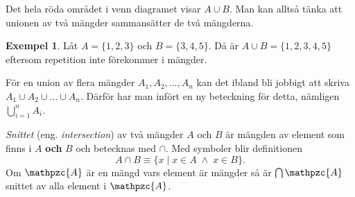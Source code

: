 \documentclass{article}
\theoremstyle{definition}
\newtheorem{exmp}[thm]{Exempel}
\begin{document}
\begin{center}
\end{center}
Det hela röda området i venn diagramet visar $A \cup B$. Man kan alltså tänka att unionen
av två mängder sammansätter de två mängderna.
\begin{exmp}
  Låt $A = \{1, 2, 3\}$ och $B = \{3, 4, 5\}$. Då är $A \cup B = \{1, 2, 3, 4, 5\}$ 
  eftersom repetition inte förekommer i mängder.   
\end{exmp}
För en union av flera mängder $A_1, A_2, \ldots, A_n$
kan det ibland bli jobbigt att skriva $A_1 \cup A_2 \cup \ldots \cup A_n$. Därför har man infört 
en ny beteckning för detta, nämligen $\bigcup\limits_{i=1}^{n} A_i$. 

\begin{mydef}{}{}
  \textit{Snittet} (eng. \textit{intersection}) av två mängder $A$ och $B$ är mängden av element som finns i $A$ \textbf{och} $B$ och
  betecknas med $\cap$. Med symboler blir definitionen
  \[A \cap B \equiv \{x \; | \; x \in A \; \land \; x \in B  \}.\]
  Om $\mathpzc{A}$ är en mängd vars element är mängder så är $\bigcap \mathpzc{A}$ 
  snittet av alla element i  $\mathpzc{A}$.
\end{mydef}
\end{document}
